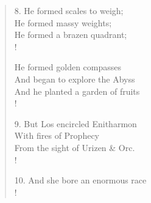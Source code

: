 \documentclass[9pt]{extarticle}
\begin{document}
\begin{verse}
\begin{altverse}
		8. He formed scales to weigh;\\
		He formed massy weights;\\
		He formed a brazen quadrant;\\!
		
		He formed golden compasses\\
		And began to explore the Abyss\\
		And he planted a garden of fruits\\!
		
		9. But Los encircled Enitharmon\\
		With fires of Prophecy\\
		From the sight of Urizen \& Orc.\\!
		
		10. And she bore an enormous race\\!
		
\end{altverse}
\end{verse}	
\end{document}
